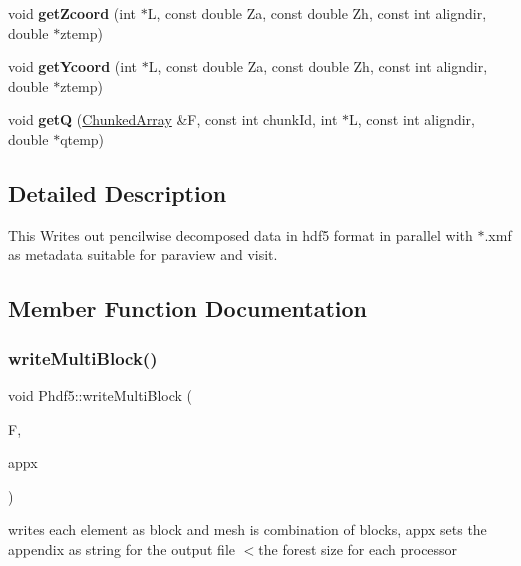 \begin{DoxyCompactItemize}
void {\bfseries get\+Zcoord} (int $\ast$L, const double Za, const double Zh, const int aligndir, double $\ast$ztemp)
\item 
\mbox{\label{classPhdf5_a98a3d6fd80e1af3699f766158c5803d1}} 
void {\bfseries get\+Ycoord} (int $\ast$L, const double Za, const double Zh, const int aligndir, double $\ast$ztemp)
\item 
\mbox{\label{classPhdf5_a4ccce9f5aa80c3573f9446c0c597415d}} 
void {\bfseries getQ} (\mbox{\hyperlink{classChunkedArray}{Chunked\+Array}} \&F, const int chunk\+Id, int $\ast$L, const int aligndir, double $\ast$qtemp)
\end{DoxyCompactItemize}


\subsection{Detailed Description}
This Writes out pencilwise decomposed data in hdf5 format in parallel with $\ast$.xmf as metadata suitable for paraview and visit. 

\subsection{Member Function Documentation}
\mbox{\label{classPhdf5_af7177501ea316b93ce36d928b620404b}} 
\subsubsection{\texorpdfstring{write\+Multi\+Block()}{writeMultiBlock()}}
{\footnotesize\ttfamily void Phdf5\+::write\+Multi\+Block (\begin{DoxyParamCaption}\item[{\mbox{\hyperlink{classChunkedArray}{Chunked\+Array}} \&}]{F,  }\item[{uint}]{appx }\end{DoxyParamCaption})}

writes each element as block and mesh is combination of blocks, appx sets the appendix as string for the output file $<$the forest size for each processor \mbox{\label{classPhdf5_a18e7864449458697b3c15146c6a8e639}} 
